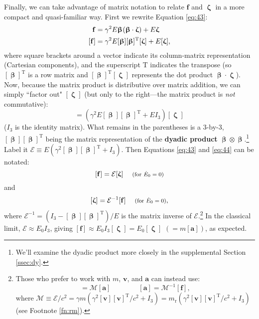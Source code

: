 \documentclass[12pt]{article}
\renewcommand{\vv}[1]{\mathbf{#1}}
\newcommand{\vvbeta}{\bm{\upbeta}}
\newcommand{\vvzeta}{\bm{\upzeta}}
\begin{document}
Finally, we can take advantage of matrix notation to relate $\vv f$ and $\vvzeta$ in a more compact and quasi-familiar way. First we rewrite Equation \ref{eq:43}:
\begin{equation*}
\begin{split}
\vv f &= \gamma^2 E \vvbeta \mkern1mu (\vvbeta \cdot \vvzeta) + E \vvzeta \\
[\vv f] &= \gamma^2 E [\vvbeta] [\vvbeta]^{\mathrm{T}} [\vvzeta] + E [\vvzeta] ,
\end{split}
\end{equation*}
where square brackets around a vector indicate its column-matrix representation (Cartesian components), and the superscript $\mathrm{T}$ indicates the transpose (so $[\vvbeta]^{\mathrm{T}}$ is a row matrix and $[\vvbeta]^{\mathrm{T}} [\vvzeta]$ represents the dot product $\vvbeta \cdot \vvzeta$). Now, because the matrix product is distributive over matrix addition, we can simply ``factor out" $[\vvzeta]$ (but only to the right---the matrix product is \emph{not} commutative):
\begin{equation*}
[\vv f] = (\gamma^2 E [\vvbeta] [\vvbeta]^{\mathrm{T}} + E I_3) [\vvzeta]
\end{equation*}
($I_3$ is the identity matrix). What remains in the parentheses is a 3-by-3, $[\vvbeta] [\vvbeta]^{\mathrm{T}}$ being the matrix representation of the \textbf{dyadic product} $\vvbeta \otimes \vvbeta$.\footnote{We'll examine the dyadic product more closely in the supplemental Section \ref{ssec:dy}.} Label it $\mathcal{E} \equiv E(\gamma^2 [\vvbeta] [\vvbeta]^{\mathrm{T}} + I_3)$. Then Equations \ref{eq:43} and \ref{eq:44} can be notated:
\begin{equation}\label{eq:48}
[\vv f] = \mathcal{E} [\vvzeta] \quad \textrm{\footnotesize{ (for $\dot{E}_0 = 0$)}}
\end{equation}
and
\begin{equation}\label{eq:49}
[\vvzeta] = \mathcal{E}^{-1} [\vv f] \quad \textrm{\footnotesize{ (for $\dot{E}_0 = 0$)}},
\end{equation}
where $\mathcal{E}^{-1} = (I_3 - [\vvbeta] [\vvbeta]^{\mathrm{T}})/E$ is the matrix inverse of $\mathcal{E}$.\footnote{Those who prefer to work with $m$, $\vv v$, and $\vv a$ can instead use:
\begin{equation*}
[\vv f] = \mathcal{M} [\vv a] \qquad \qquad [\vv a] = \mathcal{M}^{-1} [\vv f],
\end{equation*}
where $\mathcal{M} \equiv \mathcal{E} / c^2 = \gamma m (\gamma^2 [\vv v] [\vv v]^{\mathrm{T}}/c^2 + I_3) =  m_{\textrm{r}}(\gamma^2 [\vv v] [\vv v]^{\mathrm{T}}/c^2 + I_3)$ (see Footnote \ref{fn:rm}).} In the classical limit, $\mathcal{E} \approx E_0 I_3$, giving $[\vv f] \approx E_0 I_3 [\vvzeta] = E_0 [\vvzeta]$ $(= m [\vv a])$, as expected.
\end{document}
